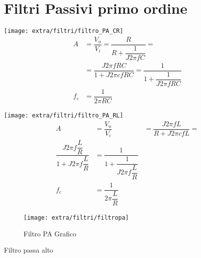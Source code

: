 \chapter{Filtri Passivi primo ordine}
\label{cha:Filtripassiviprimoord}
\begin{table}
\centering
     \begin{minipage}{0.4\textwidth}
      \centering
       \texttt{[image: extra/filtri/filtro\_PA\_CR]}
\centering
 \begin{align*}
A&=\dfrac{V_{u}}{V_{i}}
=\dfrac{R}{R+\dfrac{1}{J2\pi fC}}=\\
&=\dfrac{J2\pi fRC}{1+J2\pi cfRC}=
\dfrac{1}{1+\dfrac{1}{J2\pi fRC}}\\
f_{c}&=\dfrac{1}{2\pi RC}
        \end{align*}
       \end{minipage}\hfill
\begin{minipage}[t]{0.4\textwidth}
      \centering
\texttt{[image: extra/filtri/filtro\_PA\_RL]}
\centering
     \begin{align*}
A&=\dfrac{V_{u}}{V_{i}}&=\dfrac{J2\pi fL}{R+J2\pi cfL}=\\
\dfrac{J2\pi f\dfrac{L}{R}}{1+J2\pi f\dfrac{L}{R}}
&=\dfrac{1}{1+\dfrac{1}{J2\pi f\dfrac{L}{R}}}\\
f_{c}&=\dfrac{1}{2\pi \dfrac{L}{R}}
        \end{align*}
     \end{minipage}
 \begin{subfigure}[b]{.5\linewidth}
 	\centering\texttt{[image: extra/filtri/filtropa]}
 	\caption{Filtro PA Grafico}
 \end{subfigure}
\caption{Filtro passa alto}
\label{tab:filtropassaalto}
\end{table}
